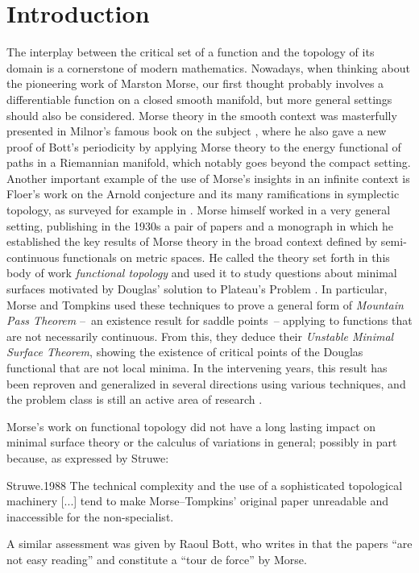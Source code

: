 
\section{Introduction}

The interplay between the critical set of a function and the topology of its domain is a cornerstone of modern mathematics.
Nowadays, when thinking about the pioneering work of Marston Morse, our first thought probably involves a differentiable function on a closed smooth manifold, but more general settings should also be considered.
Morse theory in the smooth context was masterfully presented in Milnor's famous book on the subject \cite{Milnor.1963}, where he also gave a new proof of Bott's periodicity by applying Morse theory to the energy functional of paths in a Riemannian manifold, which notably goes beyond the compact setting.
Another important example of the use of Morse's insights in an infinite context is Floer's work on the Arnold conjecture and its many ramifications in symplectic topology, as surveyed for example in \cite{Salamon.1999}.
Morse himself worked in a very general setting, publishing in the 1930s a pair of papers \cite{Morse.1937, Morse.1940} and a monograph \cite{Morse.1938} in which he established the key results of Morse theory in the broad context defined by semi-continuous functionals on metric spaces.
He called the theory set forth in this body of work \emph{functional topology} and used it to study questions about minimal surfaces motivated by Douglas' solution to Plateau’s Problem \cite{Douglas.1931}.
In particular, Morse and Tompkins \cite{Morse.1939} used these techniques to prove a general form of \emph{Mountain Pass Theorem} --~an existence result for saddle points~-- applying to functions that are not necessarily continuous.
From this, they deduce their \emph{Unstable Minimal Surface Theorem}, showing the existence of critical points of the Douglas functional that are not local minima.
In the intervening years, this result has been reproven and generalized in several directions using various techniques, and the problem class is still an active area of research \cite{Struwe.1984,Jost.1990,Jost.1991,Montezuma.2020,Marques.2021}.

Morse's work on functional topology did not have a long lasting impact on minimal surface theory or the calculus of variations in general; possibly in part because, as expressed by Struwe:
\begin{displaycquote}[p.~82]{Struwe.1988}
	The technical complexity and the use of a sophisticated topological machinery [...] tend to make Morse--Tompkins' original paper unreadable and inaccessible for the non-specialist.
\end{displaycquote}
A similar assessment was given by Raoul Bott, who writes in \cite[p.~934]{Bott.1980} that the papers \cite{Morse.1937, Morse.1940} ``are not easy reading'' and constitute a ``tour de force'' by Morse.

